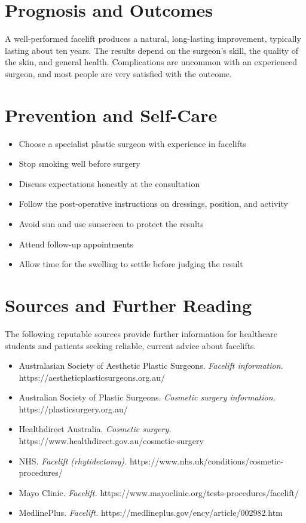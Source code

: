 \section*{Prognosis and Outcomes}
A well-performed facelift produces a natural, long-lasting improvement, typically lasting about ten years. The results depend on the surgeon's skill, the quality of the skin, and general health. Complications are uncommon with an experienced surgeon, and most people are very satisfied with the outcome.

\section*{Prevention and Self-Care}
\begin{itemize}
    \item Choose a specialist plastic surgeon with experience in facelifts
    \item Stop smoking well before surgery
    \item Discuss expectations honestly at the consultation
    \item Follow the post-operative instructions on dressings, position, and activity
    \item Avoid sun and use sunscreen to protect the results
    \item Attend follow-up appointments
    \item Allow time for the swelling to settle before judging the result
\end{itemize}

\section*{Sources and Further Reading}
The following reputable sources provide further information for healthcare students and patients seeking reliable, current advice about facelifts.
\begin{itemize}
    \item Australasian Society of Aesthetic Plastic Surgeons. \textit{Facelift information.} https://aestheticplasticsurgeons.org.au/
    \item Australian Society of Plastic Surgeons. \textit{Cosmetic surgery information.} https://plasticsurgery.org.au/
    \item Healthdirect Australia. \textit{Cosmetic surgery.} https://www.healthdirect.gov.au/cosmetic-surgery
    \item NHS. \textit{Facelift (rhytidectomy).} https://www.nhs.uk/conditions/cosmetic-procedures/
    \item Mayo Clinic. \textit{Facelift.} https://www.mayoclinic.org/tests-procedures/facelift/
    \item MedlinePlus. \textit{Facelift.} https://medlineplus.gov/ency/article/002982.htm
\end{itemize}
